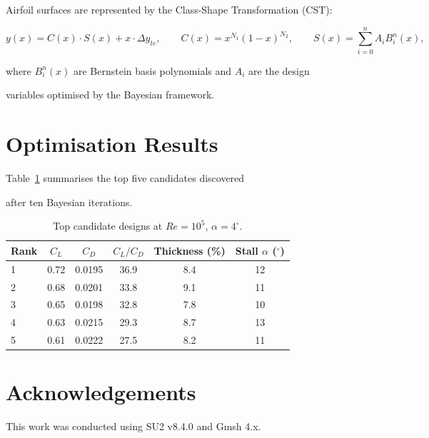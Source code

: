 \documentclass{article}
\begin{document}
Airfoil surfaces are represented by the Class-Shape Transformation (CST):



\begin{equation}

  y(x) = C(x) \cdot S(x) + x \cdot \Delta y_{te},

  \qquad

  C(x) = x^{N_1}(1-x)^{N_2},

  \qquad

  S(x) = \sum_{i=0}^{n} A_i B_i^n(x),

\end{equation}



where $B_i^n(x)$ are Bernstein basis polynomials and $A_i$ are the design

variables optimised by the Bayesian framework.




\section{Optimisation Results}




Table~\ref{tab:results} summarises the top five candidates discovered

after ten Bayesian iterations.



\begin{table}[h!]

  \centering

  \caption{Top candidate designs at $Re = 10^5$, $\alpha = 4^\circ$.}

  \label{tab:results}

  \begin{tabular}{lccccc}

    \toprule

    Rank & $C_L$ & $C_D$ & $C_L/C_D$ & Thickness (\%) & Stall $\alpha$ ($^\circ$) \\

    \midrule

    1 & 0.72 & 0.0195 & 36.9 & 8.4 & 12 \\

    2 & 0.68 & 0.0201 & 33.8 & 9.1 & 11 \\

    3 & 0.65 & 0.0198 & 32.8 & 7.8 & 10 \\

    4 & 0.63 & 0.0215 & 29.3 & 8.7 & 13 \\

    5 & 0.61 & 0.0222 & 27.5 & 8.2 & 11 \\

    \bottomrule

  \end{tabular}

\end{table}



\section*{Acknowledgements}

This work was conducted using SU2 v8.4.0 and Gmsh 4.x.
\end{document}
